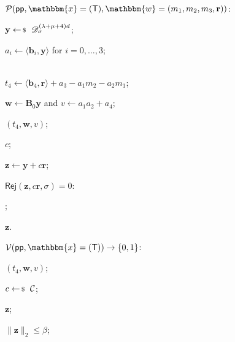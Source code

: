 \documentclass[../../book.tex]{subfiles}
\begin{document}
\begin{algoproto}[ht]
    \small
    \centering
    \begin{mdframed}[linecolor=black, linewidth=1pt,
                     skipabove=10pt, skipbelow=10pt,
                     innerleftmargin=5pt, innerrightmargin=5pt]
        \begin{minipage}[t]{0.52\linewidth}
            \colorbox{oc-blue-1}{$\mathcal{P}(\mathsf{pp}, \mathbbm{x} = (\mathsf{T}), \mathbbm{w} = (m_1, m_2, m_3, \mathbf{r}))$:}
            \begin{algoen}
                \item $\mathbf{y} \leftarrowS \dgaussian_{\sigma}^{(\lambda+\mu+4)d}$;
                \item $a_i \gets \langle \mathbf{b}_i, \mathbf{y} \rangle$ for $i=0,\dots,3$;
                \item {}
                \\ $t_4 \gets \langle \mathbf{b}_4, \mathbf{r} \rangle + a_3 - a_1m_2 - a_2m_1$;
                \item $\mathbf{w} \gets \mathbf{B}_0\mathbf{y}$ and $v \gets a_1a_2 + a_4$;
                \item {} $(t_4, \mathbf{w}, v)$;
                \item {} $c$;
                \item $\mathbf{z} \gets \mathbf{y} + c\mathbf{r}$;
                \item {} $\mathsf{Rej}(\mathbf{z}, c\mathbf{r}, \sigma) = 0$: 
                \item \hspace{5px} ;
                \item {} $\mathbf{z}$.
            \end{algoen}
        \end{minipage}
        \hfill
        \begin{minipage}[t]{0.44\linewidth}
            \colorbox{oc-blue-1}{$\mathcal{V}(\mathsf{pp}, \mathbbm{x}=(\mathsf{T})) \to \{0,1\}$:}
            \begin{algoen}
                \item {} $(t_4, \mathbf{w}, v)$;
                \item {} $c \leftarrowS \mathcal{C}$;
                \item {} $\mathbf{z}$;
                \item {} $\|\mathbf{z}\|_2 \leq \beta$;

\end{algoen}
\end{minipage}
\end{mdframed}
\end{algoproto}
\end{document}
